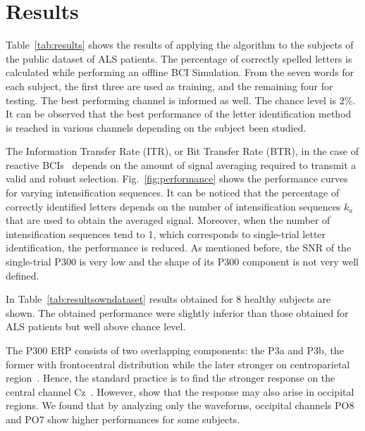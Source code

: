 \documentclass[utf8]{frontiersSCNS} %
\begin{document}
\section{Results} \label{Results}
\label{section:results}

Table~\ref{tab:results} shows the results of applying the algorithm to the subjects of the public dataset of ALS patients. The percentage of correctly spelled letters is calculated while performing an offline BCI Simulation.  From the seven words for each subject, the first three are used as training, and the remaining four for testing.  The best performing channel is informed as well. The chance level is $2\%$.  It can be observed that the best performance of the letter identification method is reached in various channels depending on the subject been studied. 

The Information Transfer Rate (ITR), or Bit Transfer Rate (BTR), in the case of reactive BCIs~\citep{WolpawJonathanR2012}  depends on the amount of signal averaging required to transmit a valid and robust selection.  Fig.~\ref{fig:performance} shows the performance curves for varying intensification sequences. It can be noticed that the percentage of correctly identified letters depends on the number of intensification sequences $k_a$ that are used to obtain the averaged signal.  Moreover, when the number of intensification sequences tend to 1, which corresponds to single-trial letter identification, the performance is reduced. As mentioned before, the SNR of the single-trial P300 is very low and the shape of its P300 component is not very well defined.

In Table~\ref{tab:resultsowndataset} results obtained for 8 healthy subjects are shown.  The obtained performance were slightly inferior than those obtained for ALS patients but well above chance level.


The P300 ERP  consists of two overlapping components: the P3a and P3b, the former with frontocentral distribution while the later stronger on centroparietal region~\citep{Polich2007}. Hence, the standard practice is to find the stronger response on the central channel Cz~\citep{Riccio2013}. However, \cite{Krusienski2006} show that the response may also arise in occipital regions.  We found that by analyzing only the waveforms, occipital channels PO8 and PO7 show higher performances for some subjects. 
\end{document}
